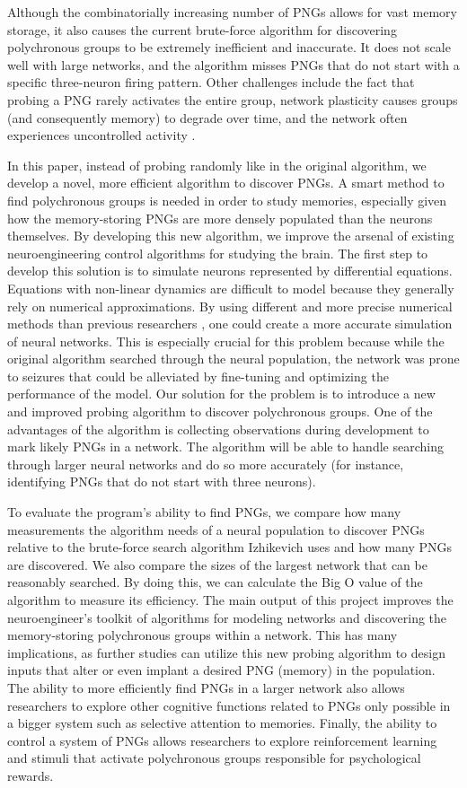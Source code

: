 \documentclass{sigchi}
\begin{document}
Although the combinatorially increasing number of PNGs allows for vast memory storage, it also causes the current brute-force algorithm for discovering polychronous groups to be extremely inefficient and inaccurate. It does not scale well with large networks, and the algorithm misses PNGs that do not start with a specific three-neuron firing pattern. Other challenges include the fact that probing a PNG rarely activates the entire group, network plasticity causes groups (and consequently memory) to degrade over time, and the network often experiences uncontrolled activity \cite{pngalgo}. 


In this paper, instead of probing randomly like in the original algorithm, we develop a novel, more efficient algorithm to discover PNGs. A smart method to find polychronous groups is needed in order to study memories, especially given how the memory-storing PNGs are more densely populated than the neurons themselves. By developing this new algorithm, we improve the arsenal of existing neuroengineering control algorithms for studying the brain. The first step to develop this solution is to simulate neurons represented by differential equations. Equations with non-linear dynamics are difficult to model because they generally rely on numerical approximations. By using different and more precise numerical methods than previous researchers \cite{simtools}, one could create a more accurate simulation of neural networks. This is especially crucial for this problem because while the original algorithm searched through the neural population, the network was prone to seizures that could be alleviated by fine-tuning and optimizing the performance of the model. Our solution for the problem is to introduce a new and improved probing algorithm to discover polychronous groups. One of the advantages of the algorithm is collecting observations during development to mark likely PNGs in a network. The algorithm will be able to handle searching through larger neural networks and do so more accurately (for instance, identifying PNGs that do not start with three neurons).


To evaluate the program’s ability to find PNGs, we compare how many measurements the algorithm needs of a neural population to discover PNGs relative to the brute-force search algorithm Izhikevich uses and how many PNGs are discovered. We also compare the sizes of the largest network that can be reasonably searched. By doing this, we can calculate the Big O value of the algorithm to measure its efficiency. The main output of this project improves the neuroengineer's toolkit of algorithms for modeling networks and discovering the memory-storing polychronous groups within a network. This has many implications, as further studies can utilize this new probing algorithm to design inputs that alter or even implant a desired PNG (memory) in the population. The ability to more efficiently find PNGs in a larger network also allows researchers to explore other cognitive functions related to PNGs only possible in a bigger system such as selective attention to memories. Finally, the ability to control a system of PNGs allows researchers to explore reinforcement learning and stimuli that activate polychronous groups responsible for psychological rewards.
\end{document}
